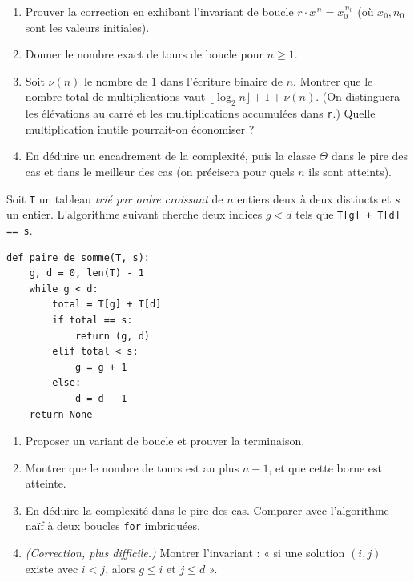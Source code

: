 \documentclass[11pt,a4paper]{article}
\begin{document}
\begin{enumerate}[label=\arabic*.,leftmargin=*]
  \item Prouver la correction en exhibant l'invariant de boucle
        $r\cdot x^{\,n} = x_0^{\,n_0}$ (où $x_0,n_0$ sont les valeurs initiales).
  \item Donner le nombre exact de tours de boucle pour $n\ge1$.
  \item Soit $\nu(n)$ le nombre de $1$ dans l'écriture binaire de $n$. Montrer que le
        nombre total de multiplications vaut $\lfloor\log_2 n\rfloor + 1 + \nu(n)$.
        (On distinguera les élévations au carré et les multiplications accumulées dans
        \texttt{r}.) Quelle multiplication inutile pourrait-on économiser ?
  \item En déduire un encadrement de la complexité, puis la classe $\Theta$ dans le
        pire des cas et dans le meilleur des cas (on précisera pour quels $n$ ils sont
        atteints).
\end{enumerate}

Soit \texttt{T} un tableau \emph{trié par ordre croissant} de $n$ entiers deux à deux
distincts et $s$ un entier. L'algorithme suivant cherche deux indices $g<d$ tels que
\texttt{T[g] + T[d] == s}.

\begin{lstlisting}
def paire_de_somme(T, s):
    g, d = 0, len(T) - 1
    while g < d:
        total = T[g] + T[d]
        if total == s:
            return (g, d)
        elif total < s:
            g = g + 1
        else:
            d = d - 1
    return None
\end{lstlisting}

\begin{enumerate}[label=\arabic*.,leftmargin=*]
  \item Proposer un variant de boucle et prouver la terminaison.
  \item Montrer que le nombre de tours est au plus $n-1$, et que cette borne est atteinte.
  \item En déduire la complexité dans le pire des cas. Comparer avec l'algorithme naïf
        à deux boucles \texttt{for} imbriquées.
  \item \emph{(Correction, plus difficile.)} Montrer l'invariant : « si une solution
        $(i,j)$ existe avec $i<j$, alors $g\le i$ et $j\le d$ ».
\end{enumerate}
\end{document}
